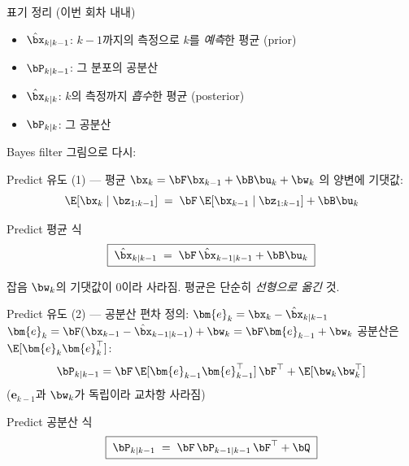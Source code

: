 \begin{frame}{표기 정리 (이번 회차 내내)}
  \begin{itemize}
    \item $\hat\bx_{k|k-1}$: $k-1$까지의 측정으로 $k$를 \emph{예측}한 평균 (prior)
    \item $\bP_{k|k-1}$: 그 분포의 공분산
    \item $\hat\bx_{k|k}$: $k$의 측정까지 \emph{흡수}한 평균 (posterior)
    \item $\bP_{k|k}$: 그 공분산
  \end{itemize}
  \pause
  \vspace{0.3em}
  Bayes filter 그림으로 다시:
  \begin{center}
  \end{center}
\end{frame}

\begin{frame}{Predict 유도 (1) — 평균}
  $\bx_{k} = \bF \bx_{k-1} + \bB \bu_k + \bw_k$ 의 양변에 기댓값:
  \[
    \E[\bx_k \mid \bz_{1:k-1}] \;=\; \bF\, \E[\bx_{k-1} \mid \bz_{1:k-1}] + \bB \bu_k
  \]
  \pause
  \vspace{0.3em}
  \begin{block}{Predict 평균 식}
    \[
      \boxed{\;\hat\bx_{k|k-1} \;=\; \bF\, \hat\bx_{k-1|k-1} + \bB \bu_k\;}
    \]
  \end{block}
  잡음 $\bw_k$의 기댓값이 0이라 사라짐. 평균은 단순히 \emph{선형으로 옮긴} 것.
\end{frame}

\begin{frame}{Predict 유도 (2) — 공분산}
  편차 정의: $\bm{e}_k = \bx_k - \hat\bx_{k|k-1}$\\
  $\bm{e}_k = \bF (\bx_{k-1} - \hat\bx_{k-1|k-1}) + \bw_k = \bF \bm{e}_{k-1} + \bw_k$
  \pause
  \vspace{0.4em}
  공분산은 $\E[\bm{e}_k \bm{e}_k^\top]$:
  \[
    \bP_{k|k-1} = \bF\, \E[\bm{e}_{k-1}\bm{e}_{k-1}^\top]\, \bF^\top + \E[\bw_k \bw_k^\top]
  \]
  ($\bm{e}_{k-1}$과 $\bw_k$가 독립이라 교차항 사라짐)
  \pause
  \vspace{0.3em}
  \begin{block}{Predict 공분산 식}
    \[
      \boxed{\;\bP_{k|k-1} \;=\; \bF\, \bP_{k-1|k-1}\, \bF^\top + \bQ\;}
    \]
  \end{block}
\end{frame}


